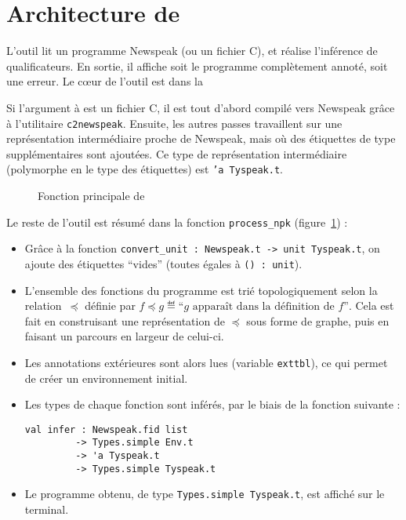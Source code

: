 \section{Architecture de \ptrtype}
\label{sec:ptrtype-archi}

L'outil \ptrtype lit un programme Newspeak (ou un fichier C), et réalise
l'inférence de qualificateurs. En sortie, il affiche soit le programme
complètement annoté, soit une erreur. Le cœur de l'outil est dans la

Si l'argument à \ptrtype est un fichier C, il est tout d'abord compilé vers
Newspeak grâce à l'utilitaire \texttt{c2newspeak}. Ensuite, les autres passes
travaillent sur une représentation intermédiaire proche de Newspeak, mais où des
étiquettes de type supplémentaires sont ajoutées. Ce type de représentation
intermédiaire (polymorphe en le type des étiquettes) est \texttt{'a Tyspeak.t}.

\begin{figure}
\caption{Fonction principale de \ptrtype}
\label{fig:implem-process}
\end{figure}

Le reste de l'outil est résumé dans la fonction
\texttt{process\_npk} (figure~\ref{fig:implem-process}) :

\begin{itemize}

\item Grâce à la fonction \texttt{convert_unit : Newspeak.t -> unit Tyspeak.t},
  on ajoute des étiquettes ``vides'' (toutes égales à \texttt{() : unit}).

\item L'ensemble des fonctions du programme est trié topologiquement selon la
  relation~$\preceq$ définie par $f \preceq g \eqdef \textrm{``} g
  \textrm{ apparaît dans la définition de } f \textrm{''}$. Cela est fait en
  construisant une représentation de $\preceq$ sous forme de graphe, puis en
  faisant un parcours en largeur de celui-ci.

\item Les annotations extérieures sont alors lues (variable \texttt{exttbl}), ce
  qui permet de créer un environnement initial.

\item Les types de chaque fonction sont inférés, par le biais de la fonction
  suivante :

\begin{Verbatim}
val infer : Newspeak.fid list
         -> Types.simple Env.t
         -> 'a Tyspeak.t
         -> Types.simple Tyspeak.t
\end{Verbatim}

\item Le programme obtenu, de type \texttt{Types.simple Tyspeak.t}, est affiché
  sur le terminal.

\end{itemize}


